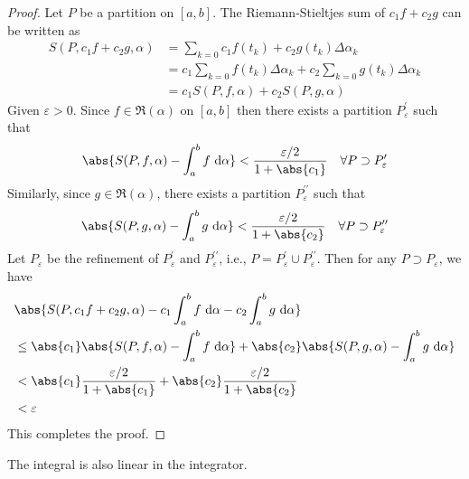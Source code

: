 \documentclass[thmcnt=section, 12pt]{elegantbook}
\begin{document}
\begin{proof}
    Let $P$ be a partition on $[a,b]$. The Riemann-Stieltjes sum of $c_1 f + c_2 g$ can be written as 
    \begin{align*}
        S(P, c_1 f + c_2 g, \alpha)
        &= \sum_{k=0} c_1 f(t_k) + c_2 g(t_k) \Delta\alpha_k \\ 
        &= c_1 \sum_{k=0} f(t_k) \Delta\alpha_k
        + c_2 \sum_{k=0} g(t_k) \Delta\alpha_k \\ 
        &= c_1 S(P, f, \alpha) + c_2 S(P, g, \alpha)
    \end{align*}
    Given $\varepsilon > 0$. Since $f \in \mathfrak{R}(\alpha)$ on $[a,b]$ then there exists a partition $P_\varepsilon^{\prime}$
    such that 
    \begin{align*}
        \abs{S(P, f, \alpha) - \int_a^b f \ \mathrm{d}\alpha} < \frac{\varepsilon / 2}{1 + \abs{c_1}}
        \quad \forall P \supset P_\varepsilon^{\prime}
    \end{align*}
    Similarly, since $g \in \mathfrak{R}(\alpha)$, there exists a partition $P_\varepsilon^{\prime\prime}$ such that 
    \begin{align*}
        \abs{S(P, g, \alpha) - \int_a^b g \ \mathrm{d}\alpha} < \frac{\varepsilon / 2}{1 + \abs{c_2}}
        \quad \forall P \supset P_\varepsilon^{\prime\prime}
    \end{align*}
    Let $P_\varepsilon$ be the refinement of $P_\varepsilon^{\prime}$ and $P_\varepsilon^{\prime\prime}$, i.e., $P = P_\varepsilon^{\prime} \cup P_\varepsilon^{\prime\prime}$. Then for any $P \supset P_\varepsilon$, we have 
    \begin{align*}
        &\abs{
            S(P, c_1 f + c_2 g, \alpha) 
            - c_1 \int_a^b f \ \mathrm{d}\alpha
            - c_2 \int_a^b g \ \mathrm{d}\alpha
        } \\
        &\leq \abs{c_1} \abs{S(P,f,\alpha) - \int_a^b f \ \mathrm{d}\alpha}
        + \abs{c_2} \abs{S(P,g,\alpha) - \int_a^b g \ \mathrm{d}\alpha} \\ 
        &< \abs{c_1} \frac{\varepsilon / 2}{1 + \abs{c_1}}
        + \abs{c_2} \frac{\varepsilon / 2}{1 + \abs{c_2}} \\ 
        &< \varepsilon
    \end{align*}
    This completes the proof.
\end{proof}


\par The integral is also linear in the integrator.
\end{document}
